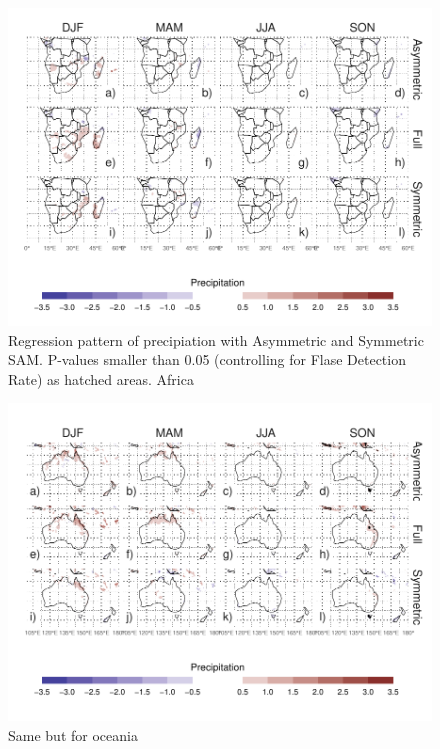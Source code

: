\documentclass[twocol]{ametsocV5}
\begin{document}
\begin{figure}
\includegraphics{pp-regr-global-africa-1} \caption[Regression pattern of precipiation with Asymmetric and Symmetric SAM]{Regression pattern of precipiation with Asymmetric and Symmetric SAM. P-values smaller than 0.05 (controlling for Flase Detection Rate) as hatched areas. Africa}\label{fig:pp-regr-global-africa}
\end{figure}

\begin{figure}
\includegraphics{pp-regr-global-oceania-1} \caption[Same but for oceania]{Same but for oceania}\label{fig:pp-regr-global-oceania}
\end{figure}
\end{document}
